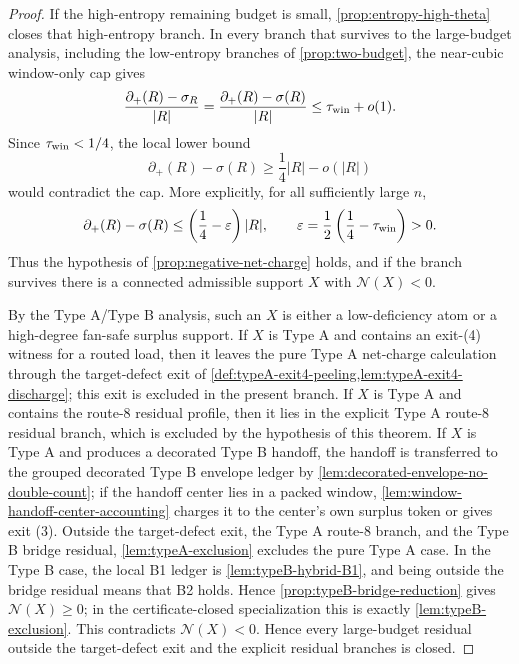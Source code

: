 \documentclass[11pt]{article}
\newcommand{\defp}{\partial_+}
\newcommand{\No}{\mathcal N}
\begin{document}
\begin{proof}
If the high-entropy remaining budget is small, \cref{prop:entropy-high-theta}
closes that high-entropy branch.  In every branch that survives to the
large-budget analysis, including the low-entropy branches of
\cref{prop:two-budget}, the near-cubic window-only cap gives
\[
\frac{\defp(R)-\sigma_R}{|R|}
=\frac{\defp(R)-\sigma(R)}{|R|}
\le\tau_{\rm win}+o(1).
\]
Since $\tau_{\rm win}<1/4$, the local lower bound
\[
\defp(R)-\sigma(R)\ge\frac14|R|-o(|R|)
\]
would contradict the cap.  More explicitly, for all sufficiently large $n$,
\[
\defp(R)-\sigma(R)
\le
\left(\frac14-\varepsilon\right)|R|,
\qquad
\varepsilon=\frac12\left(\frac14-\tau_{\rm win}\right)>0 .
\]
Thus the hypothesis of \cref{prop:negative-net-charge} holds, and if the branch
survives there is a connected admissible support $X$ with $\No(X)<0$.

By the Type A/Type B analysis, such an $X$ is either a low-deficiency atom or a
high-degree fan-safe surplus support.  If $X$ is Type A and contains an exit-(4)
witness for a routed load, then it leaves the pure Type A net-charge calculation
through the target-defect exit of
\cref{def:typeA-exit4-peeling,lem:typeA-exit4-discharge}; this exit is excluded
in the present branch.  If $X$ is Type A and contains the route-8 residual
profile, then it lies in the explicit Type A route-8 residual branch, which is
excluded by the hypothesis of this theorem.  If $X$ is Type A and produces a
decorated Type B handoff, the handoff is transferred to the
grouped decorated Type B envelope ledger by
\cref{lem:decorated-envelope-no-double-count}; if the handoff center lies in a
packed window, \cref{lem:window-handoff-center-accounting} charges it to the
center's own surplus token or gives exit (3).  Outside the target-defect exit,
the Type A route-8 branch, and the Type B bridge residual,
\cref{lem:typeA-exclusion} excludes the pure Type A case.  In the Type
B case, the local B1 ledger is \cref{lem:typeB-hybrid-B1}, and being outside the
bridge residual means that B2 holds.  Hence
\cref{prop:typeB-bridge-reduction} gives $\No(X)\ge0$; in the
certificate-closed specialization this is exactly \cref{lem:typeB-exclusion}.
This contradicts $\No(X)<0$.  Hence every large-budget residual outside the
target-defect exit and the explicit residual branches is closed.
\end{proof}
\end{document}
